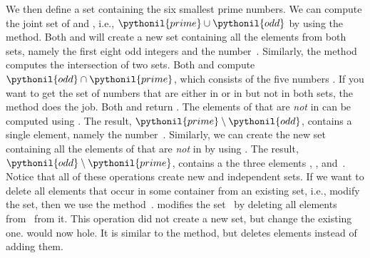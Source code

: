 \begin{sloppypar}%
We then define a set  containing the six smallest prime numbers.
We can compute the joint set of  and , i.e., $\pythonil{prime}\cup\pythonil{odd}$ by using the  method.
Both  and  will create a new set containing all the elements from both sets, namely the first eight odd integers and the number~.
Similarly, the  method computes the intersection of two sets.
Both  and  compute $\pythonil{odd}\cap\pythonil{prime}$, which consists of the five numbers .
If you want to get the set of numbers that are either in  or in  but not in both sets, the method  does the job.
Both  and  return .
The elements of  that are \emph{not} in  can be computed using .
The result, $\pythonil{prime}\setminus\pythonil{odd}$, contains a single element, namely the number~.
Similarly, we can create the new set  containing all the elements of  that are \emph{not} in  by using .
The result, $\pythonil{odd}\setminus\pythonil{prime}$, contains a the three elements , , and~.
Notice that all of these operations create new and independent sets.
If we want to delete all elements that occur in some container from an existing set, i.e., modify the set, then we use the method~.
 modifies the set~ by deleting all elements from~ from it.
This operation did not create a new set, but change the existing one.
 would now hole.
It is similar to the  method, but deletes elements instead of adding them.%
\end{sloppypar}%
%
\FloatBarrier%
\endhsection%
%
